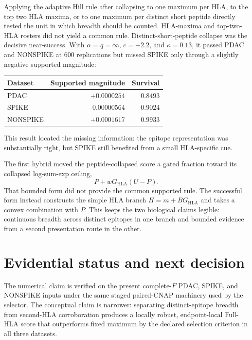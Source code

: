 \documentclass[11pt]{article}
\begin{document}
Applying the adaptive Hill rule after collapsing to one maximum per HLA, to
the top two HLA maxima, or to one maximum per distinct short peptide directly
tested the unit in which breadth should be counted. HLA-maxima and top-two-HLA
rosters did not yield a common rule. Distinct-short-peptide collapse was the
decisive near-success. With $\alpha=q=\infty$, $c=-2.2$, and
$\kappa=0.13$, it passed PDAC and NONSPIKE at 600 replications but missed
SPIKE only through a slightly negative supported magnitude:
\begin{center}
\small
\begin{tabular}{@{}lrr@{}}
\toprule
Dataset & Supported magnitude & Survival \\
\midrule
PDAC     & $+0.0000254$ & $0.8493$ \\
SPIKE    & $-0.00000564$ & $0.9024$ \\
NONSPIKE & $+0.0001617$ & $0.9933$ \\
\bottomrule
\end{tabular}
\end{center}
This result located the missing information: the epitope representation was
substantially right, but SPIKE still benefited from a small HLA-specific cue.

The first hybrid moved the peptide-collapsed score a gated fraction toward its
collapsed log-sum-exp ceiling,
\begin{equation}
P+wG_{\mathrm{HLA}}(U-P).
\end{equation}
That bounded form did not provide the common supported rule. The successful
form instead constructs the simple HLA branch $H=m+BG_{\mathrm{HLA}}$ and
takes a convex combination with $P$. This keeps the two biological claims
legible: continuous breadth across distinct epitopes in one branch and bounded
evidence from a second presentation route in the other.

\section{Evidential status and next decision}

The numerical claim is verified on the present complete-$F$ PDAC, SPIKE, and
NONSPIKE inputs under the same staged paired-CNAP machinery used by the
selector. The conceptual claim is narrower: separating distinct-epitope breadth
from second-HLA corroboration produces a locally robust, endpoint-local Full-HLA
score that outperforms fixed maximum by the declared selection criterion in all
three datasets.
\end{document}
